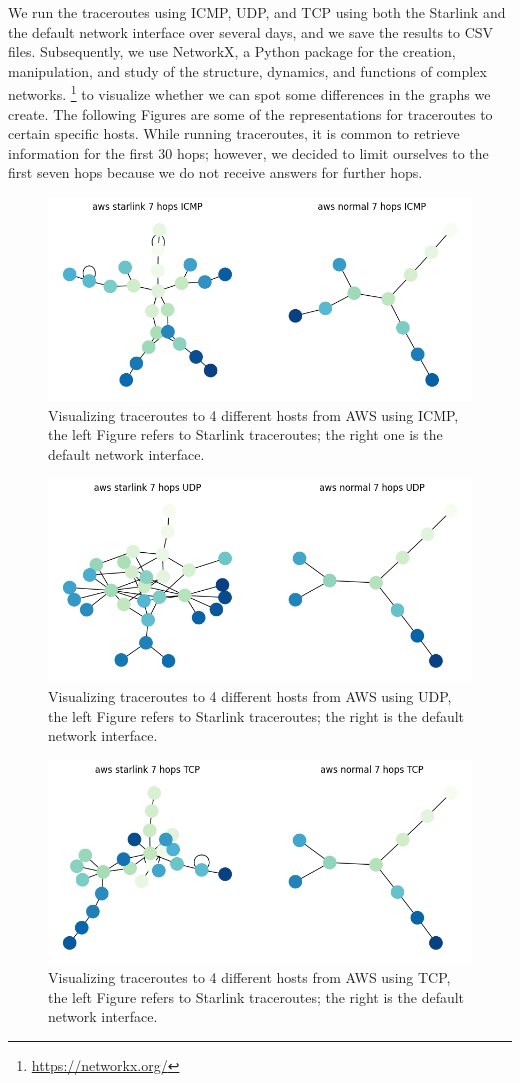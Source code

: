 \documentclass[IN,11pt,twoside,openright,idp,english]{tumthesis}
\begin{document}
We run the traceroutes using ICMP, UDP, and TCP using both the Starlink and the default network interface over several days, and we save the results to CSV files. Subsequently, we use NetworkX, a Python package for the creation, manipulation, and study of the structure, dynamics, and functions of complex networks. \footnote{\url{https://networkx.org/}} to visualize whether we can spot some differences in the graphs we create. The following Figures are some of the representations for traceroutes to certain specific hosts. While running traceroutes, it is common to retrieve information for the first 30 hops; however, we decided to limit ourselves to the first seven hops because we do not receive answers for further hops. 


\begin{figure}
    \label{fig:tr_aws_icmp}
    \centering
    \includegraphics[width=0.6\columnwidth]{img/tr_aws_icmp.png}
    \caption{Visualizing traceroutes to 4 different hosts from AWS using ICMP, the left Figure refers to Starlink traceroutes; the right one is the default network interface.}
\end{figure}
    
\begin{figure}
    \label{fig:tr_aws_udp}
    \centering
    \includegraphics[width=0.6\columnwidth]{img/tr_aws_udp.png}
    \caption{Visualizing traceroutes to 4 different hosts from AWS using UDP, the left Figure refers to Starlink traceroutes; the right is the default network interface.}
\end{figure}
    
\begin{figure}
    \label{fig:tr_aws_tcp}
    \centering
    \includegraphics[width=0.6\columnwidth]{img/tr_aws_tcp.png}
    \caption{Visualizing traceroutes to 4 different hosts from AWS using TCP, the left Figure refers to Starlink traceroutes; the right is the default network interface.}
\end{figure}
    
\end{document}
